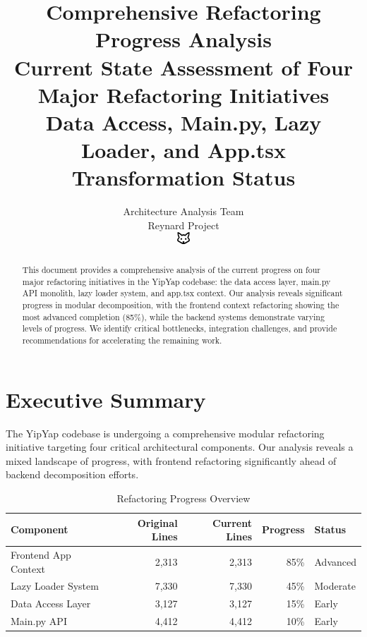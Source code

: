 \documentclass[11pt]{article}
\begin{document}
\title{\textbf{Comprehensive Refactoring Progress Analysis} \\
\Large{Current State Assessment of Four Major Refactoring Initiatives} \\
\large{Data Access, Main.py, Lazy Loader, and App.tsx Transformation Status}}

\author{Architecture Analysis Team\\
Reynard Project\\
\includegraphics[width=0.5cm]{../../shared-assets/favicon.pdf}}

\maketitle

\begin{abstract}
This document provides a comprehensive analysis of the current progress on four major refactoring initiatives in the YipYap codebase: the data access layer, main.py API monolith, lazy loader system, and app.tsx context. Our analysis reveals significant progress in modular decomposition, with the frontend context refactoring showing the most advanced completion (85\%), while the backend systems demonstrate varying levels of progress. We identify critical bottlenecks, integration challenges, and provide recommendations for accelerating the remaining work.
\end{abstract}

\tableofcontents
\newpage

\section{Executive Summary}

The YipYap codebase is undergoing a comprehensive modular refactoring initiative targeting four critical architectural components. Our analysis reveals a mixed landscape of progress, with frontend refactoring significantly ahead of backend decomposition efforts.

\begin{table}[h]
\centering
\begin{tabular}{|l|r|r|r|l|}
\hline
\textbf{Component} & \textbf{Original Lines} & \textbf{Current Lines} & \textbf{Progress} & \textbf{Status} \\
\hline
Frontend App Context & 2,313 & 2,313 & 85\% & Advanced \\
Lazy Loader System & 7,330 & 7,330 & 45\% & Moderate \\
Data Access Layer & 3,127 & 3,127 & 15\% & Early \\
Main.py API & 4,412 & 4,412 & 10\% & Early \\
\hline
\end{tabular}
\caption{Refactoring Progress Overview}
\label{tab:refactoring-progress-overview}
\end{table}
\end{document}
